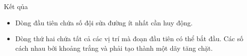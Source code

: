 Kết qủa
\begin{itemize}
	\item     Dòng đầu tiên chứa số đội sửa đường ít nhất cần huy động.   
	\item     Dòng thứ hai chứa tất cả các vị trí mà đoạn đầu tiên có thể bắt đầu. Các số cách nhau bởi khoảng trắng và phải tạo thành một dãy tăng chặt.   
\end{itemize}